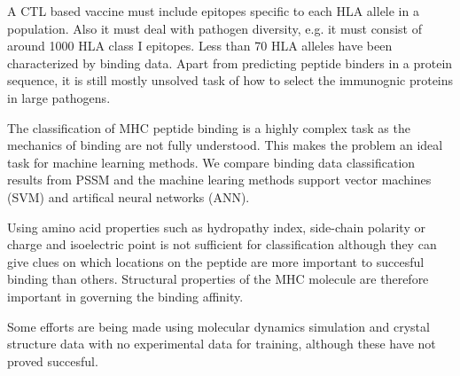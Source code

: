 A CTL based vaccine must include epitopes specific to each HLA allele in a population. Also it must deal with pathogen diversity, e.g. it must consist of around 1000 HLA class I epitopes. 
Less than 70 HLA alleles have been characterized by binding data. Apart from predicting peptide binders in a protein sequence, it is still  mostly unsolved task of how to select the immunognic proteins in large pathogens.

The classification of MHC peptide binding is a highly complex task as the mechanics of binding are not fully understood. 
This makes the problem an ideal task for machine learning methods. We compare binding data classification results from PSSM and the machine learing methods support vector machines (SVM) and artifical neural networks (ANN).

Using amino acid properties such as hydropathy index, side-chain polarity or charge and isoelectric point is not sufficient for classification although they can give clues on which locations on the peptide are more important to succesful binding than others. 
Structural properties of the MHC molecule are therefore important in governing the binding affinity.

Some efforts are being made using molecular dynamics simulation and crystal structure data with no experimental data for training, although these have not proved succesful.
